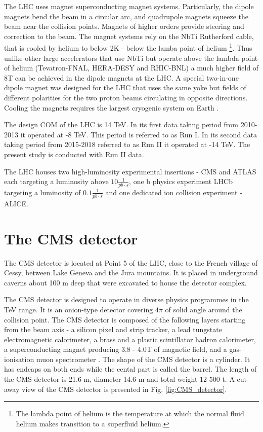 The LHC uses magnet superconducting magnet systems. Particularly, the dipole magnets bend the beam in a circular arc, and quadrupole magnets squeeze the beam near the collision points. Magnets of higher orders provide steering and correction to the beam. The magnet systems rely on the NbTi Rutherford cable, that is cooled by helium to below 2K - below the lamba point of helium \footnote{The lambda point of helium is the temperature at which the normal fluid helium makes transition to a superfluid helium.}. Thus unlike other large accelerators that use NbTi but operate above the lambda point of helium (Tevatron-FNAL, HERA-DESY and RHIC-BNL) a much higher field of 8T can be achieved in the dipole magnets at the LHC. A special two-in-one dipole magnet was designed for the LHC that uses the same yoke but fields of different polarities for the two proton beams circulating in opposite directions. Cooling the magnets requires the largest cryogenic system on Earth \cite{MYERS:2013hra} \cite{Evans:2008zzb}.

The design COM of the LHC is 14 TeV. In its first data taking period from 2010-2013 it operated at -8 TeV. This period is referred to as Run I. In its second data taking period from 2015-2018 referred to as Run II it operated at -14 TeV. The present study is conducted with Run II data.

The LHC houses two high-luminosity experimental insertions - CMS and ATLAS each targeting a luminosity above $10{\frac{1}{pb\cdot s}}$, one b physics experiment LHCb targeting a luminosity of $0.1\frac{1}{pb\cdot s}$ and one dedicated ion collision experiment - ALICE. 

\section{The CMS detector}

The CMS detector is located at Point 5 of the LHC, close to the French village of Cessy, between Lake Geneva and the Jura mountains. It is placed in underground caverns about 100 m deep that were excavated to house the detector complex.

The CMS detector is designed to operate in diverse physics programmes in the TeV range. It is an onion-type detector covering $4\pi$ of solid angle around the collision point. The CMS detector is composed of the following layers starting from the beam axis - a silicon pixel and strip  tracker, a lead tungstate electromagnetic calorimeter, a brass and a plastic scintillator hadron calorimeter, a superconducting magnet producing 3.8 - 4.0T of magnetic field, and a gas-ionisation muon spectrometer \cite{Chatrchyan:2008aa}. The shape of the CMS detector is a cylinder. It has endcaps on both ends while the cental part is called the barrel. The length of the CMS detector is 21.6 m, diameter 14.6 m and total weight 12 500 t. A cut-away view of the CMS detector is presented in Fig. \ref{fig:CMS_detector}.

